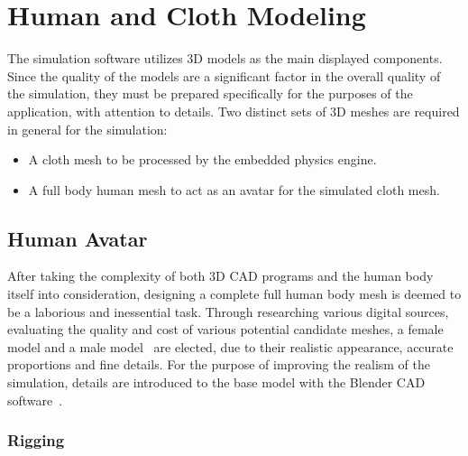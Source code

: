 \chapter{Human and Cloth Modeling} 
\label{chapter_3d_model}

The simulation software utilizes 3D models as the main displayed components. Since the quality of the models are a significant factor in the overall quality of the simulation, they must be prepared specifically for the purposes of the application, with attention to details. Two distinct sets of 3D meshes are required in general for the simulation: 

\begin{itemize}
\item A cloth mesh to be processed by the embedded physics engine.
\item A full body human mesh to act as an avatar for the simulated cloth mesh.
\end{itemize}

\section{Human Avatar}
\label{section_human_avatar}


After taking the complexity of both 3D CAD programs and the human body itself into consideration, designing a complete full human body mesh is deemed to be a laborious and inessential task. Through researching various digital sources, evaluating the quality and cost of various potential candidate meshes, a female~\cite{Mmava2012} model and a male model~\cite{Gomer2013} are elected, due to their realistic appearance, accurate proportions and fine details. For the purpose of improving the realism of the simulation, details are introduced to the base model with the Blender CAD software~\cite{Blender}.  

\subsection{Rigging}

